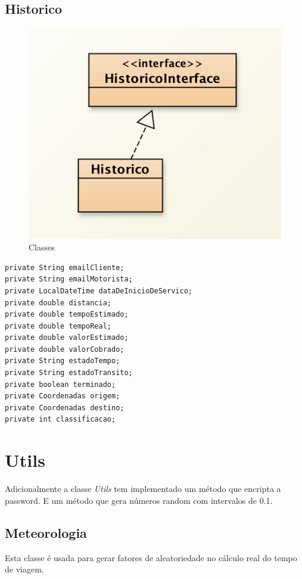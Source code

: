 \subsection{Historico}
\begin{figure}[htpb]
	\centering
	\includegraphics[scale=0.6]{imagem/historico}
	\caption{Classes }
	\label{p2:fig:p2_historico}
\end{figure}
\begin{verbatim}
private String emailCliente; 
private String emailMotorista; 
private LocalDateTime dataDeInicioDeServico;
private double distancia;
private double tempoEstimado; 
private double tempoReal;
private double valorEstimado; 
private double valorCobrado; 
private String estadoTempo;
private String estadoTransito; 
private boolean terminado; 
private Coordenadas origem;
private Coordenadas destino;
private int classificacao;
\end{verbatim}

\section{Utils}
Adicionalmente a classe \textit{Utils} tem implementado um método que encripta a password. E um método que gera números random com intervalos de 0.1. 

\subsection{Meteorologia}

Esta classe é usada para gerar fatores de aleatoriedade no cálculo real do tempo de viagem.


